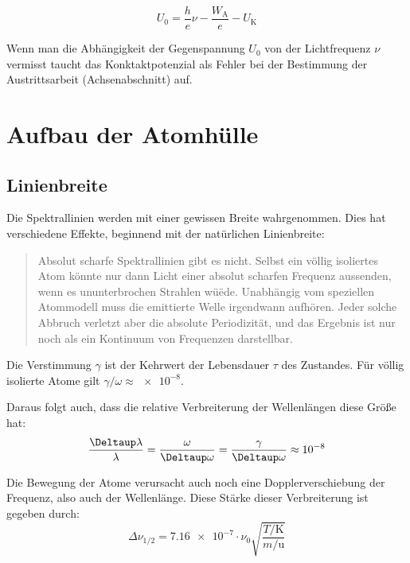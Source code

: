 \begin{equation}
    U_0 = \frac he\nu - \frac{W_\text{A}}e - U_\text{K}
    \label{eq:Energiebilanz}
\end{equation}

Wenn man die Abhängigkeit der Gegenspannung $U_0$ von der Lichtfrequenz $\nu$
vermisst taucht das Konktaktpotenzial als Fehler bei der Bestimmung der
Austrittsarbeit (Achsenabschnitt) auf.

\section{Aufbau der Atomhülle}

\subsection{Linienbreite}

Die Spektrallinien werden mit einer gewissen Breite wahrgenommen. Dies hat
verschiedene Effekte, beginnend mit der natürlichen Linienbreite:

\begin{quote}
    Absolut scharfe Spektrallinien gibt es nicht. Selbst ein völlig isoliertes
    Atom könnte nur dann Licht einer absolut scharfen Frequenz aussenden, wenn
    es ununterbrochen Strahlen wüëde. Unabhängig vom speziellen Atommodell muss
    die emittierte Welle irgendwann aufhören. Jeder solche Abbruch verletzt
    aber die absolute Periodizität, und das Ergebnis ist nur noch als ein
    Kontinuum von Frequenzen darstellbar.
    \parencite[Abschnitt~14.3.2]{meschede-gerthsen_24}
\end{quote}

Die Verstimmung $\gamma$ ist der Kehrwert der Lebensdauer $\tau$ des Zustandes.
Für völlig isolierte Atome gilt $\gamma / \omega \approx \num{e-8}$.
\parencite[Abschnitt~14.3.2]{meschede-gerthsen_24}

Daraus folgt auch, dass die relative Verbreiterung der Wellenlängen diese Größe
hat:
\[
    \frac{\Deltaup \lambda}{\lambda}
    = \frac{\omega}{\Deltaup \omega}
    = \frac{\gamma}{\Deltaup \omega}
    \approx \num{e-8}
\]

Die Bewegung der Atome verursacht auch noch eine Dopplerverschiebung der
Frequenz, also auch der Wellenlänge. Diese Stärke dieser Verbreiterung ist
gegeben durch: \parencite{chemgapedia/spektrallinien/dopplerverbreiterung}
\[
    \Delta \nu_{1/2} = \num{7.16e-7} \cdot \nu_0
    \sqrt{\frac{T/\si\kelvin}{m/\si\atomicmassunit}}
\]

